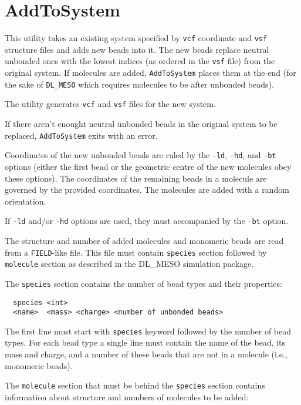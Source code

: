 \section{AddToSystem} \label{sec:AddToSystem}

This utility takes an existing system specified by \texttt{vcf} coordinate
and \texttt{vsf} structure files and adds new beads into it. The new beads
replace neutral unbonded ones with the lowest indices (as ordered in the
\texttt{vsf} file) from the original system. If molecules are added,
\texttt{AddToSystem} places them at the end (for the sake of
\texttt{DL\_MESO} which requires molecules to be after unbonded beads).

The utility generates \texttt{vcf} and \texttt{vsf} files for the new
system.

If there aren't enought neutral unbonded beads in the original system to be
replaced, \texttt{AddToSystem} exits with an error.

Coordinates of the new unbonded beads are ruled by the \texttt{-ld},
\texttt{-hd}, and \texttt{-bt} options (either the first bead or the
geometric centre of the new molecules obey these options). The coordinates
of the remaining beads in a molecule are governed by the provided
coordinates. The molecules are added with a random orientation.

If \texttt{-ld} and/or \texttt{-hd} options are used, they must accompanied
by the \texttt{-bt} option.

The structure and number of added molecules and monomeric beads are read
from a \texttt{FIELD}-like file. This file must contain \texttt{species}
section followed by \texttt{molecule} section as described in the DL\_MESO
simulation package.

The \texttt{species} section contains the number of bead types and their
properties:
\begin{verbatim}
  species <int>
  <name>  <mass> <charge> <number of unbonded beads>
\end{verbatim}
The first line must start with \texttt{species} keyword followed by the
number of bead types. For each bead type a single line must contain the name of
the bead, its mass and charge, and a number of these beads that are not
in a molecule (i.e., monomeric beads).

The \texttt{molecule} section that must be behind the \texttt{species}
section contains information about structure and numbers of molecules to be
added:

